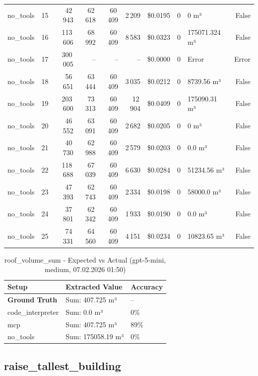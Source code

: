 \documentclass[a4paper,11pt]{article}
\begin{document}
\begin{table}[H]
{\begin{tabular}{l r r r r r r r l r}
no\_tools & 15 & 42\,943 & 62\,618 & 60\,409 & 2\,209 & \$0.0195 & 0 & 0 m³ & False \\
no\_tools & 16 & 113\,606 & 68\,992 & 60\,409 & 8\,583 & \$0.0323 & 0 & 175071.324 m³ & False \\
no\_tools & 17 & 300\,005 & -- & -- & -- & \$0.0000 & 0 & Error & Error \\
no\_tools & 18 & 56\,651 & 63\,444 & 60\,409 & 3\,035 & \$0.0212 & 0 & 8739.56 m³ & False \\
no\_tools & 19 & 203\,600 & 73\,313 & 60\,409 & 12\,904 & \$0.0409 & 0 & 175090.31 m³ & False \\
no\_tools & 20 & 46\,552 & 63\,091 & 60\,409 & 2\,682 & \$0.0205 & 0 & 0 m³ & False \\
no\_tools & 21 & 40\,730 & 62\,988 & 60\,409 & 2\,579 & \$0.0203 & 0 & 0.0 m³ & False \\
no\_tools & 22 & 118\,688 & 67\,039 & 60\,409 & 6\,630 & \$0.0284 & 0 & 51234.56 m³ & False \\
no\_tools & 23 & 47\,393 & 62\,743 & 60\,409 & 2\,334 & \$0.0198 & 0 & 58000.0 m³ & False \\
no\_tools & 24 & 37\,801 & 62\,342 & 60\,409 & 1\,933 & \$0.0190 & 0 & 0.0 m³ & False \\
no\_tools & 25 & 74\,331 & 64\,560 & 60\,409 & 4\,151 & \$0.0234 & 0 & 10823.65 m³ & False \\
\bottomrule
\end{tabular}}
\end{table}

\begin{table}[H]
\centering
\scriptsize
\caption{roof\_volume\_sum - Expected vs Actual (gpt-5-mini, medium, 07.02.2026 01:50)}
\begin{tabular}{l l l}
\toprule
Setup & Extracted Value & Accuracy \\
\midrule
\textbf{Ground Truth} & Sum: 407.725 m³ & -- \\
\midrule
code\_interpreter & Sum: 0.0 m³ & 0\% \\
mcp & Sum: 407.725 m³ & 89\% \\
no\_tools & Sum: 175058.19 m³ & 0\% \\
\bottomrule
\end{tabular}
\end{table}

\clearpage

\subsection{raise\_tallest\_building}
\end{document}
